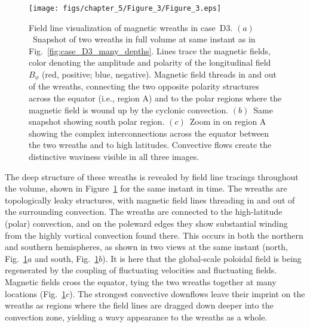 \begin{figure}
  \begin{center}
    \texttt{[image: figs/chapter\_5/Figure\_3/Figure\_3.eps]}
  \end{center}
  \caption[Field line visualization of magnetic wreaths in case~D3]
	  {Field line visualization of magnetic wreaths in case~D3.
    $(a)$~Snapshot of two wreaths in full volume at same instant
    as in Fig.~\ref{fig:case_D3_many_depths}.  Lines
    trace the magnetic fields, color denoting the amplitude and
    polarity of the longitudinal field $B_\phi$ (red, positive;
    blue, negative).  Magnetic field threads in and out of the wreaths,
    connecting the two opposite polarity structures across the equator
    (i.e., region A) and to the polar  regions where the magnetic field
    is wound up by the cyclonic convection.
    $(b)$~Same snapshot showing south polar region.  
    $(c)$~Zoom in on region A showing the complex interconnections
    across the equator between the two wreaths and to high
    latitudes.  Convective flows create the distinctive waviness
    visible in all three images.
  \label{fig:case_D3_field_lines}}
\end{figure}



The deep structure of these wreaths is revealed by field line
tracings throughout the volume, shown in
Figure~\ref{fig:case_D3_field_lines} for the same instant in time.
The wreaths are topologically leaky structures, with magnetic field
lines threading in and out of the surrounding convection.  The
wreaths are connected to the high-latitude (polar) convection, and on
the poleward edges they show substantial winding from the highly
vortical convection found there.  This occurs in both the northern and
southern hemispheres, as shown in two views at the same instant
(north, Fig.~\ref{fig:case_D3_field_lines}$a$ and south,
Fig.~\ref{fig:case_D3_field_lines}$b$).  It is here that the
global-scale poloidal field is being regenerated by the coupling of
fluctuating velocities and fluctuating fields. Magnetic fields cross the
equator, tying the two wreaths together at many locations
(Fig.~\ref{fig:case_D3_field_lines}$c$).  The strongest convective
downflows leave their imprint on the wreaths as regions where the
field lines are dragged down deeper into the convection zone, yielding
a wavy appearance to the wreaths as a whole.


